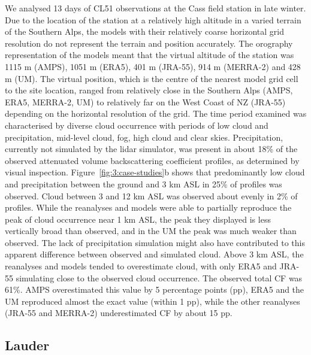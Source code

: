 We analysed 13 days of CL51 observations at the Cass field station in late
winter. Due to the location of the station at a relatively high altitude in a
varied terrain of the Southern Alps, the models with their
relatively coarse horizontal grid resolution do not represent the
terrain and position accurately. The orography representation of the models meant
that the virtual altitude of the station was 1115 m (AMPS), 1051 m (ERA5),
401 m (JRA-55), 914 m (MERRA-2) and  428 m (UM). The virtual position, which is the centre
of the nearest model grid cell to the site location, ranged from relatively
close in the Southern Alps (AMPS, ERA5, MERRA-2, UM) to relatively far on the West
Coast of NZ (JRA-55) depending on the horizontal resolution of the grid.
The time period examined was characterised by diverse cloud
occurrence with periods of low cloud and precipitation, mid-level cloud,
fog, high cloud and clear skies. Precipitation, currently not simulated by the
lidar simulator, was present in about 18\% of the observed attenuated volume backscattering coefficient profiles,
as determined by visual inspection.
Figure~\ref{fig:3:case-studies}b shows that predominantly low cloud and
precipitation between the ground and 3 km ASL in 25\% of
profiles was observed. Cloud between 3 and 12 km ASL was observed about
evenly in 2\% of profiles. While the reanalyses and models were able to partially
reproduce the peak of cloud occurrence near 1 km ASL, the peak they displayed is less vertically broad than observed,
and in the UM the peak was much weaker than observed.
The lack of precipitation simulation
might also have contributed to this apparent difference between observed and simulated
cloud. Above 3 km ASL, the reanalyses and models tended to overestimate cloud,
with only ERA5 and JRA-55 simulating close to the observed cloud occurrence.
The observed total CF was 61\%. AMPS overestimated this value by 5 percentage points (pp),
ERA5 and the UM reproduced almost the exact value (within 1 pp), while the other reanalyses (JRA-55 and MERRA-2)
underestimated CF by about 15 pp.

\subsection{Lauder}

